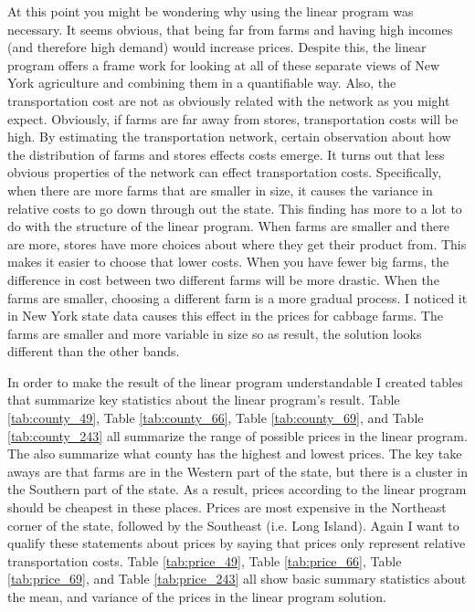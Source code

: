 \documentclass{report}
\begin{document}
At this point you might be wondering why using the linear program was necessary. It seems obvious, that being far from farms and having high incomes (and therefore high demand) would increase prices. Despite this, the linear program offers a frame work for looking at all of these separate views of New York agriculture and combining them in a quantifiable way. Also,  the transportation cost are not as obviously related with the network as you might expect. Obviously, if farms are far away from stores, transportation costs will be high. By estimating the transportation network, certain observation about how the distribution of farms and stores effects costs emerge. It turns out that less obvious properties of the network can effect transportation costs. Specifically, when there are more farms that are smaller in size, it causes the variance in relative costs to go down through out the state. This finding has more to a lot to do with the structure of the linear program. When farms are smaller and there are more, stores have more choices about where they get their product from. This makes it easier to choose that lower costs. When you have fewer big farms, the difference in cost between two different farms will be more drastic. When the farms are smaller, choosing a different farm is a more gradual process. I noticed it in New York state data causes this effect in the prices for cabbage farms. The farms are smaller and more variable in size so as result, the solution looks different than the other bands.

In order to make the result of the linear program understandable I created tables that summarize key statistics about the linear program's result. Table \ref{tab:county_49}, Table \ref{tab:county_66}, Table \ref{tab:county_69}, and Table \ref{tab:county_243} all summarize the range of possible prices in the linear program. The also summarize what county has the highest and lowest prices. The key take aways are that farms are in the Western part of the state, but there is a cluster in the Southern part of the state. As a result, prices according to the linear program should be cheapest in these places. Prices are most expensive in the Northeast corner of the state, followed by the Southeast (i.e. Long Island). Again I want to qualify these statements about prices by saying that prices only represent relative transportation costs. Table  \ref{tab:price_49}, Table  \ref{tab:price_66}, Table  \ref{tab:price_69}, and Table  \ref{tab:price_243} all show basic summary statistics about the mean, and variance of the prices in the linear program solution.
\end{document}
